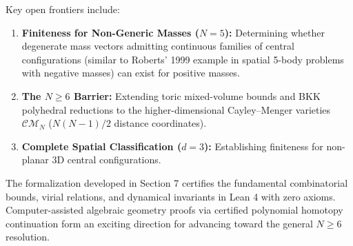 \documentclass[11pt,a4paper]{article}
\theoremstyle{definition}
\begin{document}
Key open frontiers include:
\begin{enumerate}
    \item \textbf{Finiteness for Non-Generic Masses ($N=5$):} Determining whether degenerate mass vectors admitting continuous families of central configurations (similar to Roberts' 1999 example in spatial 5-body problems with negative masses) can exist for positive masses.
    \item \textbf{The $N \ge 6$ Barrier:} Extending toric mixed-volume bounds and BKK polyhedral reductions to the higher-dimensional Cayley--Menger varieties $\mathcal{CM}_N$ ($N(N-1)/2$ distance coordinates).
    \item \textbf{Complete Spatial Classification ($d=3$):} Establishing finiteness for non-planar 3D central configurations.
\end{enumerate}

The formalization developed in Section 7 certifies the fundamental combinatorial bounds, virial relations, and dynamical invariants in Lean 4 with zero axioms. Computer-assisted algebraic geometry proofs via certified polynomial homotopy continuation form an exciting direction for advancing toward the general $N \ge 6$ resolution.
\end{document}
